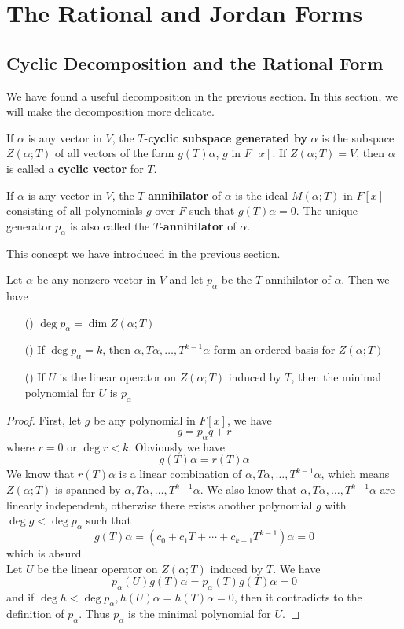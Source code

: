\documentclass{article}
\begin{document}
\section{The Rational and Jordan Forms}
\subsection{Cyclic Decomposition and the Rational Form}
We have found a useful decomposition in the previous section. In this section, we will make the decomposition more delicate.\\
\begin{dde}
	If $\alpha$ is any vector in $V$, the $T$-\textbf{cyclic subspace generated by} $\alpha$ is the subspace $Z(\alpha;T)$ of all vectors of the form $g(T)\alpha$, $g$ in $F[x]$. If $Z(\alpha;T)=V$, then $\alpha$ is called a \textbf{cyclic vector} for $T$.
\end{dde}
\begin{dde}
	If $\alpha$ is any vector in $V$, the $T$-\textbf{annihilator} of $\alpha$ is the ideal $M(\alpha;T)$ in $F[x]$ consisting of all polynomials $g$ over $F$ such that $g(T)\alpha=0$. The unique generator $p_\alpha$ is also called the $T$-\textbf{annihilator} of $\alpha$.
\end{dde}
This concept we have introduced in the previous section.
\begin{thm}
	Let $\alpha$ be any nonzero vector in $V$ and let $p_\alpha$ be the $T$-annihilator of $\alpha$. Then we have
	\begin{enumerate}
		\item [(\romannumeral1)]$\deg p_\alpha=\dim Z(\alpha;T)$
		\item [(\romannumeral2)]If $\deg p_\alpha=k$, then $\alpha,T\alpha,\dots,T^{k-1}\alpha$ form an ordered basis for $Z(\alpha;T)$
		\item [(\romannumeral3)]If $U$ is the linear operator on $Z(\alpha;T)$ induced by $T$, then the minimal polynomial for $U$ is $p_\alpha$
	\end{enumerate} 
\end{thm}
\begin{proof}
	First, let $g$ be any polynomial in $F[x]$, we have
	\[g=p_\alpha q+r\]
	where $r=0$ or $\deg r<k$. Obviously we have
	\[g(T)\alpha=r(T)\alpha\]
	We know that $r(T)\alpha$ is a linear combination of $\alpha,T\alpha,\dots,T^{k-1}\alpha$, which means $Z(\alpha;T)$ is spanned by $\alpha,T\alpha,\dots,T^{k-1}\alpha$. We also know that $\alpha,T\alpha,\dots,T^{k-1}\alpha$ are linearly independent, otherwise there exists another polynomial $g$ with $\deg g<\deg p_\alpha$ such that
	\[g(T)\alpha=(c_0+c_1T+\cdots+c_{k-1}T^{k-1})\alpha=0\]
	which is absurd.\\
	Let $U$ be the linear operator on $Z(\alpha;T)$ induced by $T$. We have
	\[p_\alpha(U)g(T)\alpha=p_\alpha(T)g(T)\alpha=0\]
	and if $\deg h<\deg p_\alpha,h(U)\alpha=h(T)\alpha=0$, then it contradicts to the definition of $p_\alpha$. Thus $p_\alpha$ is the minimal polynomial for $U$.
\end{proof}
\end{document}
